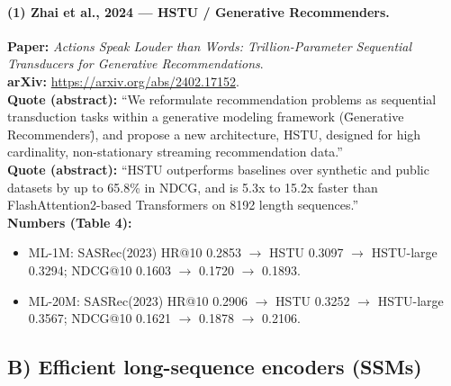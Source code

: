 \documentclass[11pt]{article}
\begin{document}
\paragraph{(1) Zhai et al., 2024 --- HSTU / Generative Recommenders.}
\textbf{Paper:} \emph{Actions Speak Louder than Words: Trillion-Parameter Sequential Transducers for Generative Recommendations}.\\
\textbf{arXiv:} \url{https://arxiv.org/abs/2402.17152}.\\
\textbf{Quote (abstract):} ``We reformulate recommendation problems as sequential transduction tasks within a generative modeling framework (\"Generative Recommenders\"), and propose a new architecture, HSTU, designed for high cardinality, non-stationary streaming recommendation data.''\\
\textbf{Quote (abstract):} ``HSTU outperforms baselines over synthetic and public datasets by up to 65.8\% in NDCG, and is 5.3x to 15.2x faster than FlashAttention2-based Transformers on 8192 length sequences.''\\
\textbf{Numbers (Table 4):}
\begin{itemize}
  \item ML-1M: SASRec(2023) HR@10 0.2853 $\rightarrow$ HSTU 0.3097 $\rightarrow$ HSTU-large 0.3294; NDCG@10 0.1603 $\rightarrow$ 0.1720 $\rightarrow$ 0.1893.
  \item ML-20M: SASRec(2023) HR@10 0.2906 $\rightarrow$ HSTU 0.3252 $\rightarrow$ HSTU-large 0.3567; NDCG@10 0.1621 $\rightarrow$ 0.1878 $\rightarrow$ 0.2106.
\end{itemize}

\subsection{B) Efficient long-sequence encoders (SSMs)}
\end{document}
